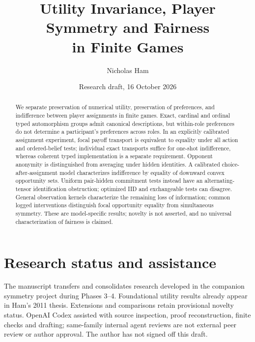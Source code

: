 \documentclass[11pt]{article}
\title{Utility Invariance, Player Symmetry and Fairness\\in Finite Games}
\author{Nicholas Ham}
\date{Research draft, 16 October 2026}
\begin{document}
\maketitle
\begin{abstract}
We separate preservation of numerical utility, preservation of preferences,
and indifference between player assignments in finite games. Exact, cardinal
and ordinal typed automorphism groups admit canonical descriptions, but
within-role preferences do not determine a participant's preferences across
roles. In an explicitly calibrated assignment experiment, focal payoff
transport is equivalent to equality under all action and ordered-belief tests;
individual exact transports suffice for one-shot indifference, whereas
coherent typed implementation is a separate requirement. Opponent anonymity
is distinguished from averaging under hidden identities. A calibrated choice-after-assignment model characterizes indifference by
equality of downward convex opportunity sets. Uniform pair-hidden commitment
tests instead have an alternating-tensor identification obstruction; optimized
IID and exchangeable tests can disagree. General observation kernels
characterize the remaining loss of information; common logged interventions
distinguish focal opportunity equality from simultaneous symmetry. These are
model-specific results; novelty is not
asserted, and no universal characterization of fairness is claimed.
\end{abstract}













\section*{Research status and assistance}
The manuscript transfers and consolidates research developed in the companion
symmetry project during Phases 3--4. Foundational utility results already
appear in Ham's 2011 thesis. Extensions and comparisons retain provisional
novelty status. OpenAI Codex assisted with source inspection, proof reconstruction,
finite checks and drafting; same-family internal agent reviews are not external
peer review or author approval. The author has not signed off this draft.
\begingroup
\small


\endgroup
\end{document}

